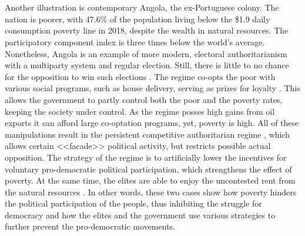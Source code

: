 \documentclass[a4paper, 12pt]{article}
\begin{document}
	\\\\
	Another illustration is contemporary Angola, the ex-Portuguese colony. The nation is poorer, with 47.6\% of the population living below the \$1.9 daily consumption poverty line in 2018, despite the wealth in natural resources. The participatory component index is three times below the world's average. Nonetheless, Angola is an example of more modern, electoral authoritarianism with a multiparty system and regular election. Still, there is little to no chance for the opposition to win such elections \parencite{angola}. The regime co-opts the poor with various social programs, such as house delivery, serving as prizes for loyalty \parencite{angola2}. This allows the government to partly control both the poor and the poverty rates, keeping the society under control. As the regime posses high gains from oil exports it can afford large co-optation programs, yet, poverty is high. All of these manipulations result in the persistent competitive authoritarian regime \parencite{oldway, newway}, which allows certain <<facade>> political activity, but restricts possible actual opposition. The strategy of the regime is to artificially lower the incentives for voluntary pro-democratic political participation, which strengthens the effect of poverty. At the same time, the elites are able to enjoy the uncontested rent from the natural resources \parencite{angola3}. In other words, these two cases show how poverty hinders the political participation of the people, thus inhibiting the struggle for democracy and how the elites and the government use various strategies to further prevent the pro-democratic movements. 
	\\
	
\end{document}
